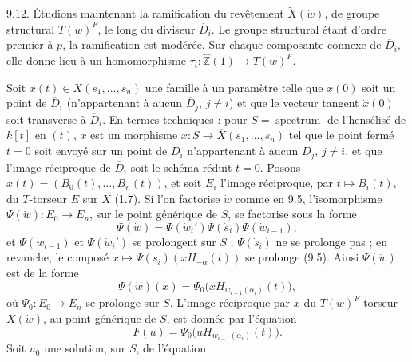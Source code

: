 \documentclass[9pt,twoside]{extarticle}
\begin{document}
{9.12. Étudions maintenant la ramification du revêtement \(\widetilde X(\dot w)\), de groupe structural \(T(w)^F\), le long du diviseur \(\overline D_i\). Le groupe structural étant d'ordre premier à \(p\), la ramification est modérée. Sur chaque composante connexe de \(\overline D_i\), elle donne lieu à un homomorphisme \(\tau_i:\widehat{\mathbb Z}(1)\to T(w)^F\).\par

Soit \(x(t)\in\overline X(s_1,\ldots,s_n)\) une famille à un paramètre telle que \(x(0)\) soit un point de \(\overline D_i\) (n'appartenant à aucun \(\overline D_j\), \(j\ne i\)) et que le vecteur tangent \(\dot x(0)\) soit transverse à \(\overline D_i\). En termes techniques : pour \(S=\operatorname{spectrum}\) de l'hensélisé de \(k[t]\) en \((t)\), \(x\) est un morphisme \(x:S\to\overline X(s_1,\ldots,s_n)\) tel que le point fermé \(t=0\) soit envoyé sur un point de \(\overline D_i\) n'appartenant à aucun \(\overline D_j\), \(j\ne i\), et que l'image réciproque de \(\overline D_i\) soit le schéma réduit \(t=0\). Posons \(x(t)=(B_0(t),\ldots,B_n(t))\), et soit \(E_i\) l'image réciproque, par \(t\mapsto B_i(t)\), du \(T\)-torseur \(E\) sur \(X\) (1.7). Si l'on factorise \(\dot w\) comme en 9.5, l'isomorphisme \(\Psi(\dot w):E_0\to E_n\), sur le point générique de \(S\), se factorise sous la forme \[
\Psi(\dot w)=\Psi(\dot w_i')\Psi(\dot s_i)\Psi(\dot w_{i-1}),
\] et \(\Psi(\dot w_{i-1})\) et \(\Psi(\dot w_i')\) se prolongent sur \(S\) ; \(\Psi(\dot s_i)\) ne se prolonge pas ; en revanche, le composé \(x\mapsto\Psi(\dot s_i)(xH_{-\alpha}(t))\) se prolonge (9.5). Ainsi \(\Psi(\dot w)\) est de la forme \[
\Psi(\dot w)(x)=\Psi_0\bigl(xH_{w_{i-1}(\alpha_i)}(t)\bigr),
\] où \(\Psi_0:E_0\to E_n\) se prolonge sur \(S\). L'image réciproque par \(x\) du \(T(w)^F\)-torseur \(\widetilde X(\dot w)\), au point générique de \(S\), est donnée par l'équation \[
\tag{9.12.1}
F(u)=\Psi_0\bigl(uH_{w_{i-1}(\alpha_i)}(t)\bigr).
\] Soit \(u_0\) une solution, sur \(S\), de l'équation\par
}
\end{document}

